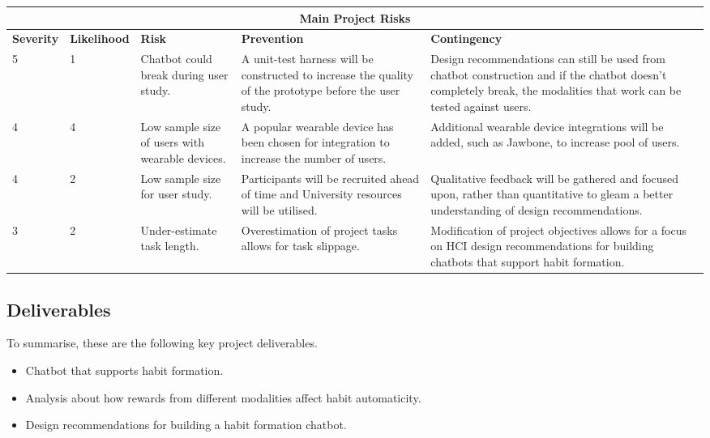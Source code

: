 \begin{center}
\begin{tabular}{ |p{1.5cm}|p{1.9cm}|p{2.3cm}|p{3.3cm}|p{5cm}| }
  \hline \multicolumn{5}{|c|}{Main Project Risks} \\ \hline %
  \textbf{Severity} & \textbf{Likelihood} & \textbf{Risk} & \textbf{Prevention} & \textbf{Contingency} \\ \hline %
  5 & 1 & Chatbot could break during user study. & A unit-test harness will be constructed to increase the quality of the prototype before the user study. & Design recommendations can still be used from chatbot construction and if the chatbot doesn't completely break, the modalities that work can be tested against users. \\ \hline
  4 & 4 & Low sample size of users with wearable devices. & A popular wearable device has been chosen for integration to increase the number of users. & Additional wearable device integrations will be added, such as Jawbone, to increase pool of users. \\ \hline
  4 & 2 & Low sample size for user study. & Participants will be recruited ahead of time and University resources will be utilised. & Qualitative feedback will be gathered and focused upon, rather than quantitative to gleam a better understanding of design recommendations.\\ \hline
  3 & 2 & Under-estimate task length. & Overestimation of project tasks allows for task slippage. & Modification of project objectives allows for a focus on HCI design recommendations for building chatbots that support habit formation. \\ \hline
\end{tabular}
\end{center}

\subsection{Deliverables}
To summarise, these are the following key project deliverables.

\begin{itemize}
  \item Chatbot that supports habit formation.
  \item Analysis about how rewards from different modalities affect habit automaticity.
  \item Design recommendations for building a habit formation chatbot.
\end{itemize}
